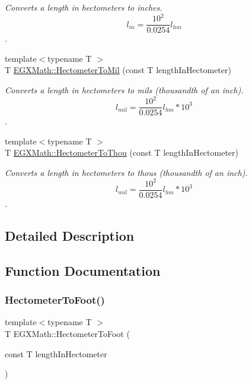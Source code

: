 \begin{DoxyCompactItemize}
\begin{DoxyCompactList}\small\item\em Converts a length in hectometers to inches. \[ l_{in}= \frac{10^{2}}{0.0254} l_{hm} \]. \end{DoxyCompactList}\item 
{\footnotesize template$<$typename T $>$ }\\T \mbox{\hyperlink{group___e_g_x_math-_conversions-_length_conversions-_s_i-_hectometer-_imperial_ga117bf04e7f132a33598fa098a8b7c17e}{E\+G\+X\+Math\+::\+Hectometer\+To\+Mil}} (const T length\+In\+Hectometer)
\begin{DoxyCompactList}\small\item\em Converts a length in hectometers to mils (thousandth of an inch). \[ l_{mil}= \frac{10^{2}}{0.0254} l_{hm} * 10^{3} \]. \end{DoxyCompactList}\item 
{\footnotesize template$<$typename T $>$ }\\T \mbox{\hyperlink{group___e_g_x_math-_conversions-_length_conversions-_s_i-_hectometer-_imperial_gabfd81bd5bb9e8293005c23794f541a1c}{E\+G\+X\+Math\+::\+Hectometer\+To\+Thou}} (const T length\+In\+Hectometer)
\begin{DoxyCompactList}\small\item\em Converts a length in hectometers to thous (thousandth of an inch). \[ l_{mil}= \frac{10^{2}}{0.0254} l_{hm} * 10^{3} \]. \end{DoxyCompactList}\end{DoxyCompactItemize}


\subsection{Detailed Description}


\subsection{Function Documentation}
\mbox{\label{group___e_g_x_math-_conversions-_length_conversions-_s_i-_hectometer-_imperial_ga8b57e6e5bef662cc96b8b7dde68659a6}} 
\subsubsection{\texorpdfstring{Hectometer\+To\+Foot()}{HectometerToFoot()}}
{\footnotesize\ttfamily template$<$typename T $>$ \\
T E\+G\+X\+Math\+::\+Hectometer\+To\+Foot (\begin{DoxyParamCaption}\item[{const T}]{length\+In\+Hectometer }\end{DoxyParamCaption})}



